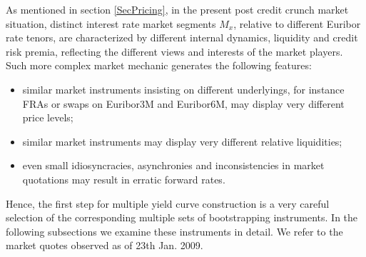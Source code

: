 \documentclass[11pt,reqno]{amsart}
\begin{document}
As mentioned in section \ref{SecPricing}, in the present post credit crunch market situation, distinct interest rate market segments $M_x$, relative to different Euribor rate tenors, are characterized by different internal dynamics, liquidity and credit risk premia, reflecting the different views and interests of the market players.
Such more complex market mechanic generates the following features:
\begin{itemize}
\item similar market instruments insisting on different underlyings, for instance FRAs or swaps on Euribor3M and Euribor6M, may display very different price levels;
\item similar market instruments may display very different relative liquidities;
\item even small idiosyncracies, asynchronies and inconsistencies in market quotations may result in erratic forward rates.
\end{itemize}
Hence, the first step for multiple yield curve construction is a very careful selection of the corresponding multiple sets of bootstrapping instruments. In the following subsections we examine these instruments in detail. We refer to the market quotes observed as of 23th Jan. 2009.
\end{document}
